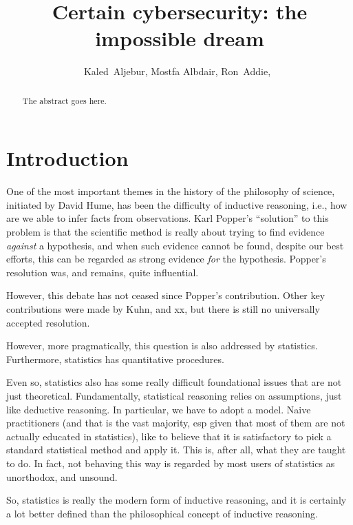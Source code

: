 \documentclass[journal]{IEEEtran}
\begin{document}
\title{Certain cybersecurity: the impossible dream}

\author{Kaled~Aljebur,
  Mostfa Albdair,
  Ron~Addie,~
}%

\markboth{}{}

\maketitle


\begin{abstract}
  The abstract goes here.
\end{abstract}

\IEEEpeerreviewmaketitle



\section{Introduction}
One of the most important themes in the history of the philosophy of science,
initiated by David Hume, has been the difficulty of inductive reasoning,
i.e., how are we able to infer facts from observations.
Karl Popper's ``solution'' to this problem
is that the scientific method is really about trying to find evidence
  {\em against} a hypothesis, and when such evidence cannot be found, despite our best
efforts, this can be regarded as strong evidence {\em for} the hypothesis.
Popper's resolution was, and remains, quite influential.

However, this debate has not ceased since Popper's contribution.
Other key contributions were made by Kuhn, and xx,
but there is still no universally accepted resolution.

However, more pragmatically, this question is also addressed by
statistics. Furthermore, statistics has quantitative procedures.

Even so, statistics also has some really difficult foundational issues
that are not just theoretical. Fundamentally, statistical reasoning relies
on assumptions, just like deductive reasoning. In particular, we have
to adopt a model. Naive practitioners (and that is the vast majority,
esp given that most of them are not actually educated in statistics),
like to believe that it is satisfactory to pick a standard statistical
method and apply it. This is, after all, what they are taught to do. In
fact, not behaving this way is regarded by most users of statistics as
unorthodox, and unsound.

So, statistics is really the modern form of inductive reasoning, and
it is certainly a lot better defined than the philosophical concept of
inductive reasoning.
\end{document}
